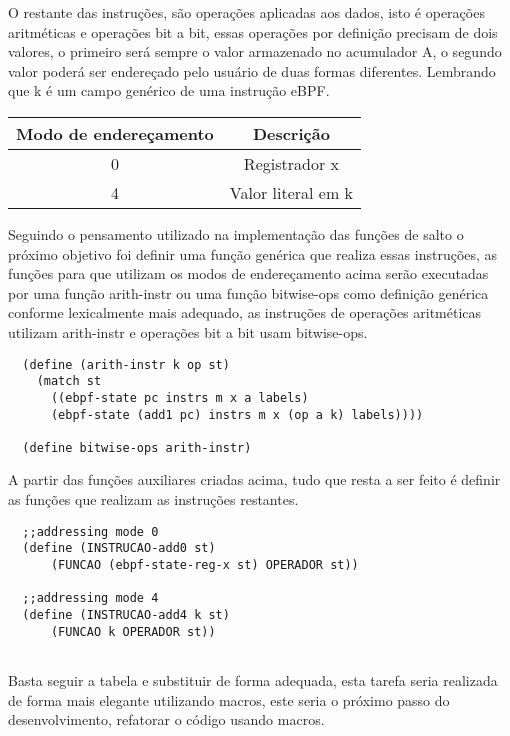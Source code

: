 \documentclass[paper=a4, fontsize=12pt]{article}
\theoremstyle{definition}
\begin{document}
O restante das instruções, são operações aplicadas aos dados, isto é operações aritméticas e operações bit a bit,
essas operações por definição precisam de dois valores, o primeiro será sempre o valor armazenado no acumulador A, o
segundo valor poderá ser endereçado pelo usuário de duas formas diferentes.
Lembrando que k é um campo genérico de uma instrução eBPF.

\begin{center}
  \begin{tabular}{ |c|c| }
    \hline
    Modo de endereçamento & Descrição\\
    \hline
    0 & Registrador x\\
    \hline
    4 & Valor literal em k\\
    \hline
  \end{tabular}
  \end{center}

Seguindo o pensamento utilizado na implementação das funções de salto o próximo objetivo foi definir uma função genérica que realiza
essas instruções, as funções para que utilizam os modos de endereçamento acima serão executadas por uma função arith-instr ou uma
função bitwise-ops como definição genérica conforme lexicalmente mais adequado, as instruções de operações aritméticas utilizam
arith-instr e operações bit a bit usam bitwise-ops. 

\begin{lstlisting}
  (define (arith-instr k op st)
    (match st
      ((ebpf-state pc instrs m x a labels)
      (ebpf-state (add1 pc) instrs m x (op a k) labels))))

  (define bitwise-ops arith-instr)
\end{lstlisting}

A partir das funções auxiliares criadas acima, tudo que resta a ser feito é definir as funções que realizam as 
instruções restantes.

\begin{lstlisting}
  ;;addressing mode 0
  (define (INSTRUCAO-add0 st)
      (FUNCAO (ebpf-state-reg-x st) OPERADOR st))
  
  ;;addressing mode 4
  (define (INSTRUCAO-add4 k st)
      (FUNCAO k OPERADOR st))
  
\end{lstlisting}

Basta seguir a tabela e substituir de forma adequada, esta tarefa seria realizada de forma mais elegante
utilizando macros, este seria o próximo passo do desenvolvimento, refatorar o código usando macros.
\end{document}
